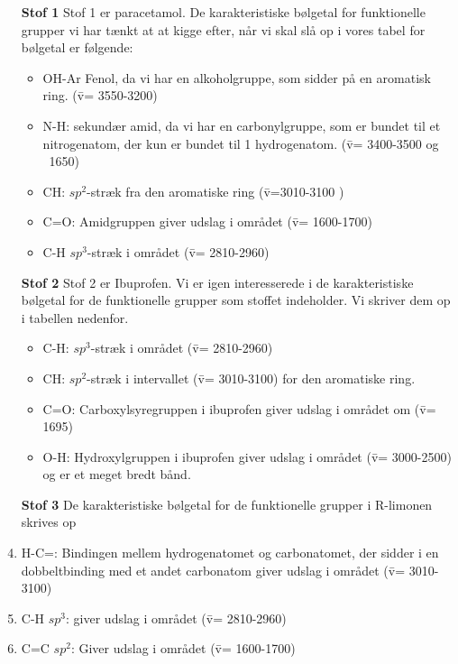 \begin{enumerate}
\item[\textbf{Stof 1}] 
Stof 1 er paracetamol. De karakteristiske bølgetal for funktionelle grupper vi har tænkt at at kigge efter, når vi skal slå op i vores tabel for bølgetal er følgende: 
\begin{itemize}
\item OH-Ar Fenol, da vi har en alkoholgruppe, som sidder på en aromatisk ring. (\={v}= 3550-3200)

\item N-H: sekundær amid, da vi har en carbonylgruppe, som er bundet til et nitrogenatom, der kun er bundet til 1 hydrogenatom. (\={v}= 3400-3500 og ~1650)

\item CH: $sp^2$-stræk fra den aromatiske ring (\={v}=3010-3100 )

\item C=O: Amidgruppen giver udslag i området (\={v}= 1600-1700)

\item C-H $sp^3$-stræk i området (\={v}= 2810-2960)
\end{itemize}

\item[\textbf{Stof 2}]
Stof 2 er Ibuprofen. Vi er igen interesserede i de karakteristiske bølgetal for de funktionelle grupper som stoffet indeholder. Vi skriver dem op i tabellen nedenfor. 

\begin{itemize}
\item C-H: $sp^3$-stræk i området (\={v}= 2810-2960)

\item CH: $sp^2$-stræk i intervallet (\={v}= 3010-3100) for den aromatiske ring. 

\item C=O: Carboxylsyregruppen i ibuprofen giver udslag i området om (\={v}= 1695)

\item O-H: Hydroxylgruppen i ibuprofen giver udslag i området (\={v}= 3000-2500) og er et meget bredt bånd. 
\end{itemize}
\item[\textbf{Stof 3}]
De karakteristiske bølgetal for de funktionelle grupper i R-limonen skrives op

\item H-C=: Bindingen mellem hydrogenatomet og carbonatomet, der sidder i en dobbeltbinding med et andet carbonatom giver udslag i området (\={v}=  3010-3100)

\item C-H $sp^3$: giver udslag i området (\={v}= 2810-2960)

\item C=C $sp^2$: Giver udslag i området (\={v}= 1600-1700)
\end{enumerate}

